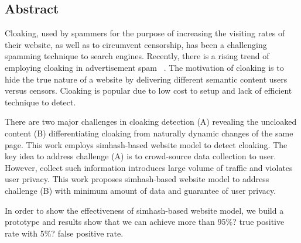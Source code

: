 
\subsection*{Abstract}
Cloaking, used by spammers for the purpose of increasing the visiting rates of
their website, as well as to circumvent censorship, has been a challenging
spamming technique to search engines. Recently, there is a rising trend of
employing
cloaking in advertisement spam ~\cite{li2012knowing}.  The motivation of
cloaking 
is to hide the true nature of a website by delivering different semantic
content users versus censors.
Cloaking is popular due to low cost to setup and lack of efficient technique
to detect.

There are two major challenges in cloaking detection (A) revealing the
uncloaked content 
(B) differentiating cloaking from naturally dynamic changes of the same page.
This work employs
simhash-based website model to detect cloaking. The key idea to address
challenge 
(A) is to crowd-source data collection to user. However, collect such
information 
introduces large volume of traffic and violates user privacy. 
This work proposes simhash-based website model to address challenge (B)
with minimum amount of data and guarantee of user privacy.

In order to show the effectiveness of simhash-based website model, we build
a prototype and results 
show that we can achieve more than 95\%? true positive rate with 5\%? false
positive rate.



